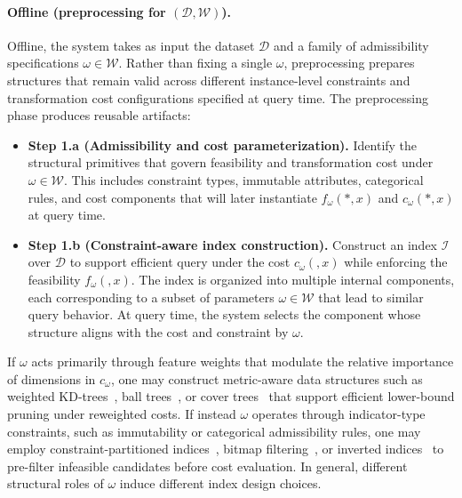 \paragraph{Offline (preprocessing for $(\mathcal D,\mathcal W)$).}
Offline, the system takes as input the dataset $\mathcal D$ and a family of admissibility specifications $\omega \in \mathcal W$.  Rather than fixing a single $\omega$, preprocessing prepares structures that remain valid across different instance-level constraints and transformation cost configurations specified at query time. The preprocessing phase produces reusable artifacts:
\begin{itemize}
    \item \textbf{Step 1.a (Admissibility and cost parameterization).} 
    Identify the structural primitives that govern feasibility and transformation cost under $\omega \in \mathcal W$. This includes constraint types, immutable attributes, categorical rules, and cost components that will later instantiate $f_\omega(*,x)$ and $c_\omega(*,x)$ at query time.
    \item \textbf{Step 1.b (Constraint-aware index construction).} Construct an index $\mathcal I$ over $\mathcal D$ to support efficient query under the cost $c_\omega(,x)$ while enforcing the feasibility $f_\omega(,x)$. The index is organized into multiple internal components, each corresponding to a subset of parameters $\omega \in \mathcal W$ that lead to similar query behavior. At query time, the system selects the component whose structure aligns with the cost and constraint by $\omega$.
\end{itemize}
If $\omega$ acts primarily through feature weights that modulate the relative importance of dimensions in $c_\omega$, one may construct metric-aware data structures such as weighted KD-trees~\cite{reif2022scalable}, ball trees~\cite{dolatshah2015ball}, or cover trees~\cite{izbicki2015faster} that support efficient lower-bound pruning under reweighted costs. If instead $\omega$ operates through indicator-type constraints, such as immutability or categorical admissibility rules, one may employ constraint-partitioned indices~\cite{lee2019constraint}, bitmap filtering~\cite{chan1998bitmap}, or inverted indices~\cite{babenko2014inverted} to pre-filter infeasible candidates before cost evaluation. In general, different structural roles of $\omega$ induce different index design choices. 

